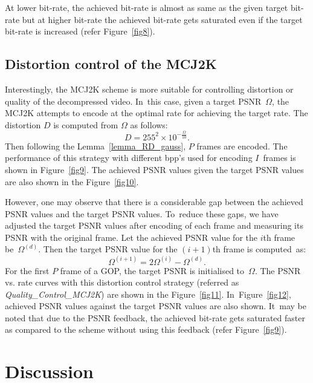 \documentclass{doublecol-new}
\theoremstyle{TH}{
\newtheorem{lemma}{Lemma}[section]
\newtheorem{theorem}{Theorem}
\newtheorem{corrolary}{Corrolary}
\newtheorem{conjecture}[lemma]{Conjecture}
\newtheorem{proposition}[lemma]{Proposition}
\newtheorem{claim}[lemma]{Claim}
\newtheorem{stheorem}[lemma]{Wrong Theorem}
}
\theoremstyle{THrm}{
\newtheorem{definition}{Definition}[section]
\newtheorem{question}{Question}[section]
\newtheorem{remark}{Remark}[section]
\newtheorem{scheme}{Scheme}
}
\theoremstyle{THhit}{
\newtheorem{case}{Case}[section]
}
\begin{document}
At lower bit-rate, the achieved bit-rate is almost as same as the given target
bit-rate but at higher bit-rate the achieved bit-rate gets saturated even if the
target bit-rate is increased (refer Figure~\ref{fig8}).

\subsection{Distortion control of the MCJ2K}\label{distortion_control}

Interestingly, the MCJ2K scheme is more suitable for controlling distortion or
quality of the decompressed video. In~this case, given a target PSNR~$\Omega$,
the MCJ2K attempts to encode at the optimal rate for achieving the target rate.
The
 distortion $D$ is computed from $\Omega$ as follows:
\begin{equation}\label{eqn_D_PSNR}
 D=255^2\times 10^{-\frac{\Omega}{10}}.
\end{equation}
Then following the Lemma~\ref{lemma_RD_gauss}, $P$ frames are encoded. The
performance  of this strategy with different bpp's used for encoding $I$~frames
is shown  in Figure~\ref{fig9}. The achieved PSNR values given the target PSNR
values are also
 shown in the Figure~\ref{fig10}.

However, one may observe that there is a considerable gap between the achieved
PSNR values and the target PSNR values. To~reduce these gaps, we have adjusted
the target PSNR values after encoding of each frame and measuring its PSNR with
the original frame. Let the achieved PSNR value for the $i$th frame
be~$\Omega^{(d)}$.
 Then the target PSNR value for the $(i+1)$th frame is computed~as:
\begin{equation}
    \Omega^{(i+1)}=2\Omega^{(i)}-\Omega^{(d)}.
\end{equation}
For the first $P$ frame of a GOP, the target PSNR is initialised to~$\Omega$.
The PSNR vs. rate curves with this distortion control strategy (referred as {\it
Quality\_Control\_MCJ2K})
 are shown in the Figure~\ref{fig11}. In~Figure~\ref{fig12},
 achieved PSNR values against the target
 PSNR values are also shown. It~may be noted that due to the
PSNR feedback, the achieved  bit-rate gets saturated faster as compared to the
scheme without using this feedback (refer Figure~\ref{fig9}).

\section{Discussion}\label{discussion}
\end{document}
